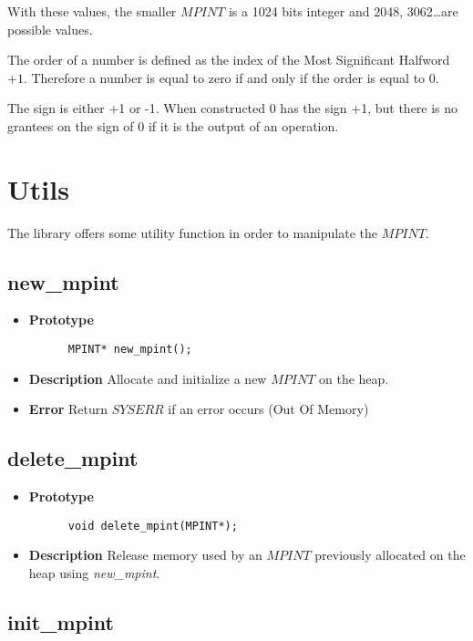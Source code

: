 \documentclass[10pt,a4paper]{article}
\begin{document}
  With these values, the smaller $MPINT$ is a 1024 bits integer and 2048, 3062\dots are possible values.
  
  The order of a number is defined as the index of the Most Significant Halfword $+ 1$. Therefore a number is equal to zero if and only if the order is equal to 0.
  
  The sign is either +1 or -1. When constructed 0 has the sign +1, but there is no grantees on the sign of 0 if it is the output of an operation. 
  
  \section{Utils}
  
  The library offers some utility function in order to manipulate the $MPINT$.
  
  \subsection{new\_mpint}
  
  \begin{itemize}
    \item [] \textbf{Prototype}
    \begin{lstlisting}
      MPINT* new_mpint();
    \end{lstlisting}
    \item [] \textbf{Description} Allocate and initialize a new $MPINT$ on the heap.
    \item [] \textbf{Error} Return $SYSERR$ if an error occurs (Out Of Memory)
  \end{itemize}
  
  \subsection{delete\_mpint}
  
  \begin{itemize}
    \item [] \textbf{Prototype}
    \begin{lstlisting}
      void delete_mpint(MPINT*);
    \end{lstlisting}
    \item [] \textbf{Description} Release memory used by an $MPINT$ previously allocated on the heap using \textit{new\_mpint}.
  \end{itemize}
  
  \subsection{init\_mpint}
  
\end{document}
